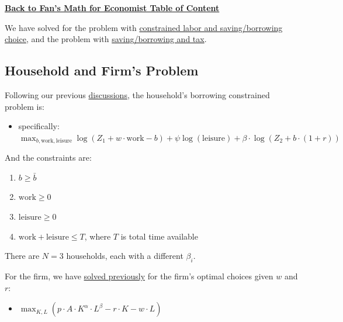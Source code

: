 \documentclass[
]{book}
\providecommand{\tightlist}{%
  \setlength{\itemsep}{0pt}\setlength{\parskip}{0pt}}
\begin{document}
\href{https://fanwangecon.github.io/Math4Econ/}{\textbf{Back to Fan's Math for Economist Table of
Content}}

We have solved for the problem with \href{https://fanwangecon.github.io/Math4Econ/optimization_application/household_asset_labor_constrained.html}{constrained labor and
saving/borrowing
choice},
and the problem with \href{https://fanwangecon.github.io/Math4Econ/equilibrium/equilibrium_constrainedborrow.html}{saving/borrowing and
tax}.

\hypertarget{household-and-firms-problem}{%
\subsection{Household and Firm's Problem}\label{household-and-firms-problem}}

Following our previous
\href{https://fanwangecon.github.io/Math4Econ/optimization_application/household_asset_labor_constrained.html}{discussions},
the household's borrowing constrained problem is:

\begin{itemize}
\tightlist
\item
  specifically:
  \(\max_{b,\textrm{work},\textrm{leisure}} \log (Z_1 +w\cdot \textrm{work}-b)+\psi \log (\textrm{leisure})+\beta \cdot \log (Z_2 +b\cdot (1+r))\)
\end{itemize}

And the constraints are:

\begin{enumerate}
\def\labelenumi{\arabic{enumi}.}
\item
  \(\displaystyle b\ge \bar{b}\)
\item
  \(\displaystyle \textrm{work}\ge 0\)
\item
  \(\displaystyle \textrm{leisure}\ge 0\)
\item
  \(\textrm{work}+\textrm{leisure}\le T\), where \(T\) is total time
  available
\end{enumerate}

There are \(N=3\) households, each with a different \(\beta_i\).

For the firm, we have \href{https://fanwangecon.github.io/Math4Econ/matrix_application/KL_borrowhire_firm.html}{solved
previously}
for the firm's optimal choices given \(w\) and \(r\):

\begin{itemize}
\tightlist
\item
  \(\displaystyle \max_{K,L} \left(p\cdot A\cdot K^{\alpha } \cdot L^{\beta } -r\cdot K-w\cdot L\right)\)
\end{itemize}
\end{document}
